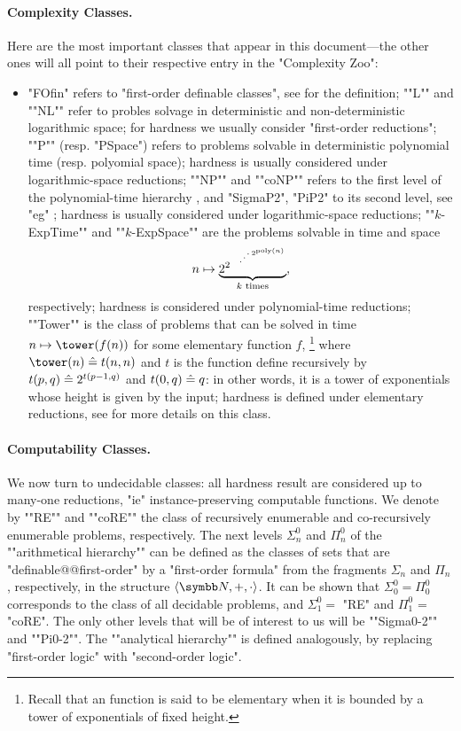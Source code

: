 \paragraph*{Complexity Classes.}
Here are the most important classes that appear in this document---the other ones
will all point to their respective entry in the "Complexity Zoo":
\begin{itemize}
	\item "FOfin" refers to "first-order definable classes", see  for the definition;
	\itemAP ""L"" and ""NL"" refer to probles solvage in deterministic and non-deterministic logarithmic 
	space; for hardness we usually consider "first-order reductions";
	\itemAP ""P"" (resp. "PSpace") refers to problems solvable in deterministic polynomial time
	(resp. polyomial space); hardness is usually considered under logarithmic-space reductions;
	\itemAP ""NP"" and ""coNP"" refers to the first level of the polynomial-time hierarchy
		\cite[\S~2]{AroraBarak2009ComputationalComplexity},
		and "SigmaP2", "PiP2" to its second level,
		see "eg" \cite[\S~5]{AroraBarak2009ComputationalComplexity};
		hardness is usually considered under logarithmic-space reductions;
	\itemAP ""$k$-ExpTime"" and ""$k$-ExpSpace"" are the
		problems solvable in time and space
		\[n \mapsto \underbrace{2^{2^{{\,\rotatebox{90}{\tiny$\ddots$}\,}^{2^{\textrm{poly}(n)}}}}}_{k \text{ times}},\]
		respectively; hardness is considered under polynomial-time reductions;
	\itemAP ""Tower"" is the class of problems that can be solved in time
		$n\mapsto \tower(f(n))$ for some elementary function $f$,%
		\footnote{Recall that an function is said to be elementary when it
		is bounded by a tower of exponentials of fixed height.}
		where $\tower(n) \defeq t(n,n)$ and $t$ is the function
		define recursively by $t(p,q) \mathrel{\hat{=}} 2^{t(p-1,q)}$ and $t(0,q) \mathrel{\hat{=}} q$:
		in other words, it is a tower of exponentials whose height is given by the input;
		hardness is defined under elementary reductions,
		see \cite{Schmitz2016ComplexityHierarchies} for more details on this class.
\end{itemize}

\paragraph*{Computability Classes.}
We now turn to undecidable classes: all hardness result are considered up to
many-one reductions, "ie" instance-preserving computable functions.
We denote by \AP""RE"" and ""coRE"" the class of recursively enumerable
and co-recursively enumerable problems, respectively. 
The next levels $\Sigma^0_n$ and $\Pi^0_n$ of the \AP""arithmetical hierarchy"" can be defined 
as the classes of sets that are "definable@@first-order" by a "first-order formula"
from the fragments $\Sigma_n$ and $\Pi_n$, respectively, in the structure $\tup{\N,+,\cdot}$.
It can be shown that $\Sigma^0_0 = \Pi^0_0$ corresponds to the class of all decidable problems,
and $\Sigma^0_1 =$ "RE" and $\Pi^0_1$ = "coRE". The only other levels that will be of interest
to us will be \AP""Sigma0-2"" and ""Pi0-2"".
The ""analytical hierarchy"" is defined analogously, by replacing "first-order logic" with
"second-order logic".


